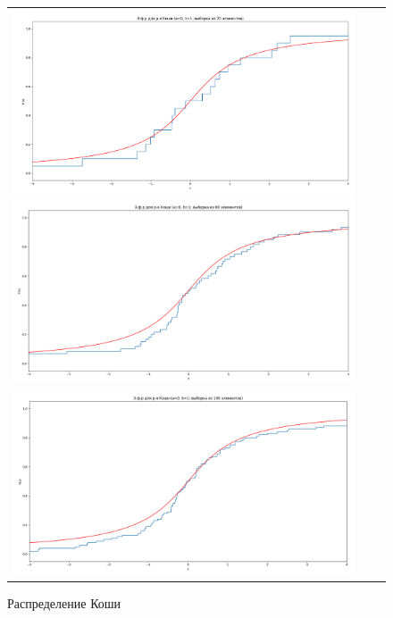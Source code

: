 \begin{figure}[H]
	\begin{tabular}{ccc}
		\includegraphics[scale=0.14]{resources/4_cauchy_20.png}
		\includegraphics[scale=0.14]{resources/4_cauchy_60.png}
		\includegraphics[scale=0.14]{resources/4_cauchy_100.png}
	\end{tabular}
	\caption{Распределение Коши}
\end{figure}

